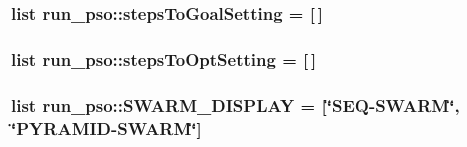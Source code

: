 \hypertarget{namespacerun__pso_23deae49a95629b541d9a3778f51bdc6}{
\subsubsection{\setlength{\rightskip}{0pt plus 5cm}list {\bf run\_\-pso::stepsToGoalSetting} = \mbox{[}$\,$\mbox{]}}}
\label{namespacerun__pso_23deae49a95629b541d9a3778f51bdc6}


\hypertarget{namespacerun__pso_e4ac6b9de35b72adc7a9754b3340e5b7}{
\subsubsection{\setlength{\rightskip}{0pt plus 5cm}list {\bf run\_\-pso::stepsToOptSetting} = \mbox{[}$\,$\mbox{]}}}
\label{namespacerun__pso_e4ac6b9de35b72adc7a9754b3340e5b7}


\hypertarget{namespacerun__pso_13cf63525e65585d452649b7ede35473}{
\subsubsection{\setlength{\rightskip}{0pt plus 5cm}list {\bf run\_\-pso::SWARM\_\-DISPLAY} = \mbox{[}\char`\"{}SEQ-SWARM\char`\"{}, \char`\"{}PYRAMID-SWARM\char`\"{}\mbox{]}}}
\label{namespacerun__pso_13cf63525e65585d452649b7ede35473}


